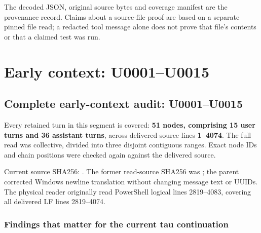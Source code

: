 The decoded JSON, original source bytes and coverage manifest are the
provenance record. Claims about a source-file proof are based on a
separate pinned file read; a redacted tool message alone does not prove
that file's contents or that a claimed test was run.

\clearpage

\section{Early context: U0001--U0015}\label{early-context-u0001u0015}

\subsection{Complete early-context audit:
U0001--U0015}\label{complete-early-context-audit-u0001u0015}

Every retained turn in this segment is covered: \textbf{51 nodes,
comprising 15 user turns and 36 assistant turns}, across delivered
source lines \textbf{1--4074}. The full read was collective, divided
into three disjoint contiguous ranges. Exact node IDs and chain
positions were checked again against the delivered source.

Current source SHA256:
\protect{}.
The former read-source SHA256 was
\protect{};
the parent corrected Windows newline translation without changing
message text or UUIDs. The physical reader originally read PowerShell
logical lines 2819--4083, covering all delivered LF lines 2819--4074.

\subsubsection{Findings that matter for the current tau
continuation}\label{findings-that-matter-for-the-current-tau-continuation}


